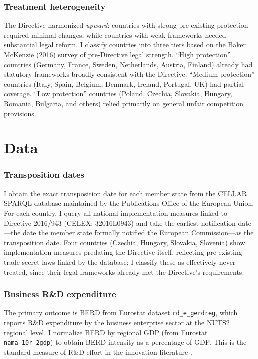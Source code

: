 \documentclass[12pt]{article}
\begin{document}
\subsubsection*{Treatment heterogeneity} The Directive harmonized \textit{upward}: countries with strong pre-existing protection required minimal changes, while countries with weak frameworks needed substantial legal reform. I classify countries into three tiers based on the Baker McKenzie (2016) survey of pre-Directive legal strength. ``High protection'' countries (Germany, France, Sweden, Netherlands, Austria, Finland) already had statutory frameworks broadly consistent with the Directive. ``Medium protection'' countries (Italy, Spain, Belgium, Denmark, Ireland, Portugal, UK) had partial coverage. ``Low protection'' countries (Poland, Czechia, Slovakia, Hungary, Romania, Bulgaria, and others) relied primarily on general unfair competition provisions.


\section{Data}
\label{sec:data}

\subsubsection*{Transposition dates} I obtain the exact transposition date for each member state from the CELLAR SPARQL database maintained by the Publications Office of the European Union. For each country, I query all national implementation measures linked to Directive 2016/943 (CELEX: 32016L0943) and take the earliest notification date---the date the member state formally notified the European Commission---as the transposition date. Four countries (Czechia, Hungary, Slovakia, Slovenia) show implementation measures predating the Directive itself, reflecting pre-existing trade secret laws linked by the database; I classify these as effectively never-treated, since their legal frameworks already met the Directive's requirements.

\subsubsection*{Business R\&D expenditure} The primary outcome is BERD from Eurostat dataset \texttt{rd\_e\_gerdreg}, which reports R\&D expenditure by the business enterprise sector at the NUTS2 regional level. I normalize BERD by regional GDP (from Eurostat \texttt{nama\_10r\_2gdp}) to obtain BERD intensity as a percentage of GDP. This is the standard measure of R\&D effort in the innovation literature \citep{OECD2015Frascati}.
\end{document}
